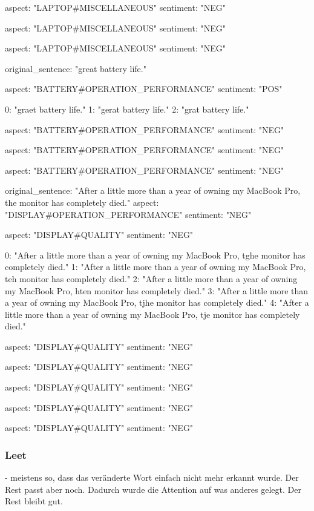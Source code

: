     aspect: "LAPTOP#MISCELLANEOUS"
    sentiment: "NEG"

    aspect: "LAPTOP#MISCELLANEOUS"
    sentiment: "NEG"

aspect: "LAPTOP#MISCELLANEOUS"
sentiment: "NEG"

original_sentence: "great battery life."

    aspect: "BATTERY#OPERATION_PERFORMANCE"
    sentiment: "POS"

0: "graet battery life."
1: "gerat battery life."
2: "grat battery life."

    aspect: "BATTERY#OPERATION_PERFORMANCE"
    sentiment: "NEG"

    aspect: "BATTERY#OPERATION_PERFORMANCE"
    sentiment: "NEG"

aspect: "BATTERY#OPERATION_PERFORMANCE"
sentiment: "NEG"

original_sentence: "After a little more than a year of owning my MacBook Pro, the monitor has completely died."
aspect: "DISPLAY#OPERATION_PERFORMANCE"
sentiment: "NEG"

    aspect: "DISPLAY#QUALITY"
    sentiment: "NEG"

0: "After a little more than a year of owning my MacBook Pro, tghe monitor has completely died."
1: "After a little more than a year of owning my MacBook Pro, teh monitor has completely died."
2: "After a little more than a year of owning my MacBook Pro, hten monitor has completely died."
3: "After a little more than a year of owning my MacBook Pro, tjhe monitor has completely died."
4: "After a little more than a year of owning my MacBook Pro, tje monitor has completely died."

    aspect: "DISPLAY#QUALITY"
    sentiment: "NEG"

    aspect: "DISPLAY#QUALITY"
    sentiment: "NEG"

    aspect: "DISPLAY#QUALITY"
    sentiment: "NEG"

    aspect: "DISPLAY#QUALITY"
    sentiment: "NEG"

aspect: "DISPLAY#QUALITY"
sentiment: "NEG"

\subsubsection{Leet}

- meistens so, dass das veränderte Wort einfach nicht mehr erkannt wurde. Der Rest passt aber noch. Dadurch wurde die Attention auf was anderes gelegt. Der Rest bleibt gut.

